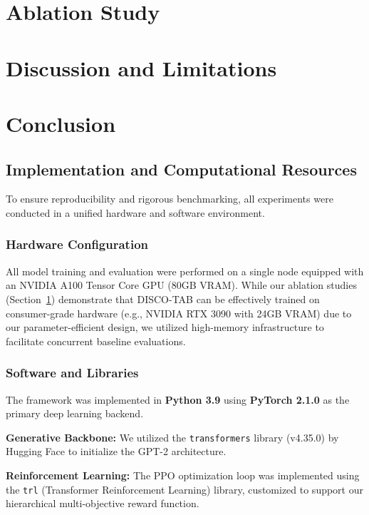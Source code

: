 \documentclass[journal,twoside,web]{ieeecolor}
\newcommand{\rev}[1]{{\color{blue}#1}}
\begin{document}
\section{Ablation Study}\label{sec:ablation}


\section{Discussion and Limitations}\label{sec:discussion}


\section{Conclusion}\label{sec:conclusion}





\appendix
\subsection{Implementation and Computational Resources}
\label{sec:implementation}

To ensure reproducibility and rigorous benchmarking, all experiments were conducted in a unified hardware and software environment.

\subsubsection{Hardware Configuration}
All model training and evaluation were performed on a single node equipped with \rev{an NVIDIA A100 Tensor Core GPU (80GB VRAM)}. While our ablation studies (Section~\rev{\ref{sec:ablation}}) demonstrate that DISCO-TAB can be effectively trained on consumer-grade hardware (e.g., NVIDIA RTX 3090 with 24GB VRAM) due to our parameter-efficient design, we utilized high-memory infrastructure to facilitate concurrent baseline evaluations.

\subsubsection{Software and Libraries}
The framework was implemented in \textbf{Python 3.9} using \textbf{PyTorch 2.1.0} as the primary deep learning backend.

\textbf{Generative Backbone:} We utilized the \texttt{transformers} library (v4.35.0) by Hugging Face to initialize the GPT-2 architecture.

\textbf{Reinforcement Learning:} The PPO optimization loop was implemented using the \texttt{trl} (Transformer Reinforcement Learning) library, customized to support our hierarchical multi-objective reward function.
\end{document}
